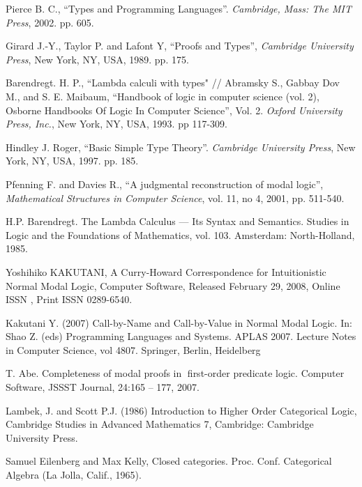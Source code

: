 \documentclass[a4paper]{article}
\begin{document}
\begin{thebibliography}{}
   Pierce B. C., ``Types and Programming Languages''. \textit{Cambridge, Mass: The MIT
  Press}, 2002. pp. 605. \parskip=1mm

   Girard J.-Y., Taylor P. and  Lafont Y, ``Proofs and Types'', \textit{Cambridge University
  Press}, New York, NY, USA, 1989. pp. 175. \parskip=1mm

   Barendregt. H. P., ``Lambda calculi with types" // Abramsky S., Gabbay Dov M., and S. E.
  Maibaum, ``Handbook of logic in computer science (vol. 2), Osborne Handbooks Of Logic In Computer
  Science'', Vol. 2. \textit{Oxford University Press, Inc.}, New York, NY, USA, 1993. pp 117-309.
  \parskip=1mm

   Hindley J. Roger, ``Basic Simple Type Theory''. \textit{Cambridge University Press}, New
  York, NY, USA, 1997. pp. 185. \parskip=1mm

   Pfenning F. and Davies R., ``A judgmental reconstruction of modal logic'',
  \textit{Mathematical Structures in Computer Science}, vol. 11, no 4, 2001, pp. 511-540. \parskip=1mm

   H.P. Barendregt. The Lambda Calculus --- Its Syntax and Semantics. Studies in Logic and
  the Foundations of Mathematics, vol. 103. Amsterdam: North-Holland, 1985.

   Yoshihiko KAKUTANI, A Curry-Howard Correspondence for Intuitionistic Normal Modal Logic, Computer Software, Released February 29, 2008, Online ISSN , Print ISSN 0289-6540.

   Kakutani Y. (2007) Call-by-Name and Call-by-Value in Normal Modal Logic. In: Shao Z. (eds) Programming Languages and Systems. APLAS 2007. Lecture Notes in Computer Science, vol 4807. Springer, Berlin, Heidelberg

   T. Abe. Completeness of modal proofs in first-order predicate logic. Computer Software, JSSST Journal, 24:165 -- 177, 2007.

   Lambek, J. and Scott P.J. (1986) Introduction to Higher Order Categorical Logic, Cambridge Studies in Advanced Mathematics 7, Cambridge: Cambridge University Press.

   Samuel Eilenberg and Max Kelly, Closed categories. Proc. Conf. Categorical Algebra (La Jolla, Calif., 1965).

\end{thebibliography}
\end{document}
